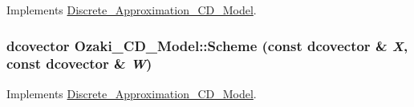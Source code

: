 Implements \hyperlink{class_discrete___approximation___c_d___model_7a3dcae055d90be0b8a231eff961e2a2}{Discrete\_\-Approximation\_\-CD\_\-Model}.\hypertarget{class_ozaki___c_d___model_394a9716158c403c06c4416f01e661a9}{
\subsubsection[{Scheme}]{\setlength{\rightskip}{0pt plus 5cm}dcovector Ozaki\_\-CD\_\-Model::Scheme (const dcovector \& {\em X}, \/  const dcovector \& {\em W})}}
\label{class_ozaki___c_d___model_394a9716158c403c06c4416f01e661a9}




Implements \hyperlink{class_discrete___approximation___c_d___model_1ea9a1d618890fc51db6fa98eeb7af7f}{Discrete\_\-Approximation\_\-CD\_\-Model}.